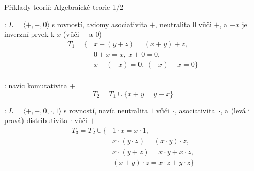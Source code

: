 \documentclass{beamer}
\begin{document}
\begin{frame}{Příklady teorií: Algebraické teorie 1/2}

    : $L=\langle +,-,0\rangle$ s rovností, axiomy 
    \alert{asociativita $+$}, \alert{neutralita $0$ vůči $+$}, a \alert{$-x$ je inverzní prvek k $x$ (vůči $+$ a $0$)}
    {\small
    \begin{align*}
        T_1=\{& x + (y + z) = (x + y) + z,\\
            & 0 + x = x,\ x + 0 = 0,\\
            & x + (-x) = 0,\ (-x) + x = 0\}\\
    \end{align*}
    }
   
    \vspace{-24pt}

    : navíc \alert{komutativita $+$} 
    {\small
    $$
    T_2=T_1\cup\{x+y=y+x\}
    $$
    }

    \vspace{-6pt}

    : $L=\langle +,-,0,\cdot,1\rangle$ s rovností, navíc \alert{neutralita $1$ vůči~$\cdot$}, \alert{asociativita~$\cdot$}, a \alert{(levá i pravá) distributivita $\cdot$ vůči $+$}
    {\small
    \begin{align*}
        T_3=T_2\cup\{   & 1 \cdot x = x \cdot 1,\\
        & x \cdot (y \cdot z) = (x \cdot y) \cdot z,\\
        & x \cdot (y + z) = x \cdot y + x \cdot z,\\
        & (x + y) \cdot z = x \cdot z + y \cdot z\}
    \end{align*}
    }
\end{frame}
    
\end{document}
